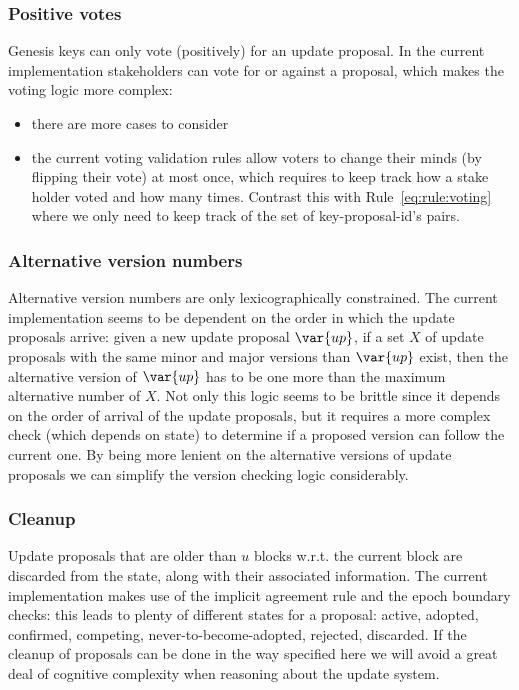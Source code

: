 \subsubsection{Positive votes}
\label{sec:only-positive-votes}

Genesis keys can only vote (positively) for an update proposal. In the current
implementation stakeholders can vote for or against a proposal, which makes the
voting logic more complex:
\begin{itemize}
\item there are more cases to consider
\item the current voting validation rules allow voters to change their minds
  (by flipping their vote) at most once, which requires to keep track how a
  stake holder voted and how many times. Contrast this with
  Rule~\ref{eq:rule:voting} where we only need to keep track of the set of
  key-proposal-id's pairs.
\end{itemize}

\subsubsection{Alternative version numbers}
\label{sec:alt-version-numbers-constraints}

Alternative version numbers are only lexicographically constrained. The current
implementation seems to be dependent on the order in which the update proposals
arrive: given a new update proposal $\var{up}$, if a set $X$ of update
proposals with the same minor and major versions than $\var{up}$ exist, then
the alternative version of $\var{up}$ has to be one more than the maximum
alternative number of $X$. Not only this logic seems to be brittle since it
depends on the order of arrival of the update proposals, but it requires a more
complex check (which depends on state) to determine if a proposed version can
follow the current one. By being more lenient on the alternative versions of
update proposals we can simplify the version checking logic considerably.

\subsubsection{Cleanup}
\label{sec:up-cleanup}

Update proposals that are older than $u$ blocks w.r.t. the current block are
discarded from the state, along with their associated information. The current
implementation makes use of the implicit agreement rule and the epoch boundary
checks: this leads to plenty of different states for a proposal: active,
adopted, confirmed, competing, never-to-become-adopted, rejected, discarded. If
the cleanup of proposals can be done in the way specified here we will avoid a
great deal of cognitive complexity when reasoning about the update system.

